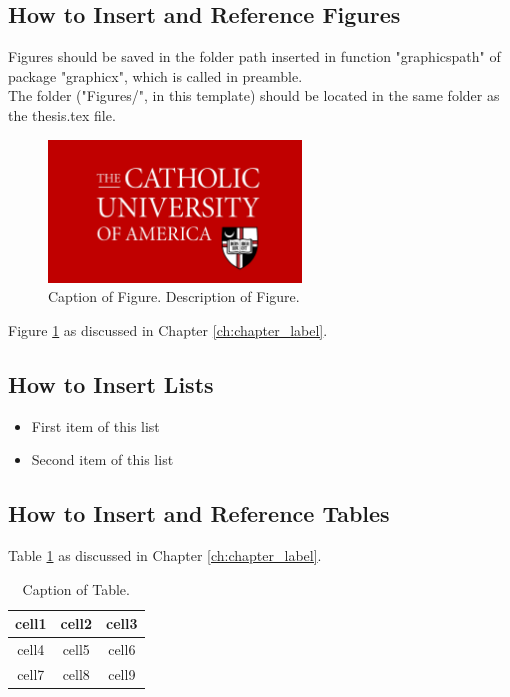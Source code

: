 \documentclass[12pt]{report}
\begin{document}
\subsection{How to Insert and Reference Figures}
Figures should be saved in the folder path inserted in function "graphicspath" of package "graphicx", which is called in preamble. \\
The folder ("Figures/", in this template) should be located in the same folder as the thesis.tex file. 
\begin{figure}[h!]
	\centering
	\includegraphics[width =0.6\textwidth]{Figure_CUA.pdf} %
	\singlespacing \caption[Caption of Figure]{Caption of Figure. Description of Figure.}
	\label{fig:CUA}
\end{figure} 

Figure \ref{fig:CUA} as discussed in Chapter \ref{ch:chapter_label}. 


\subsection{How to Insert Lists}
\begin{itemize}
	\item First item of this list
	\item Second item of this list 
\end{itemize}

\subsection{How to Insert and Reference Tables}
Table \ref{tab:table_label} as discussed in Chapter \ref{ch:chapter_label}. 
\begin{table}[h!]
	\centering
	\singlespacing \caption{Caption of Table.}
	\label{tab:table_label}%
	\begin{adjustbox}{width=0.5\textwidth}
		\begin{tabular}{ |c|c|c| } 
			\hline
			cell1 & cell2 & cell3 \\ 
			\hline
			cell4 & cell5 & cell6 \\ 
			cell7 & cell8 & cell9 \\ 
			\hline
		\end{tabular}
	\end{adjustbox}
	
\end{table}
\end{document}
